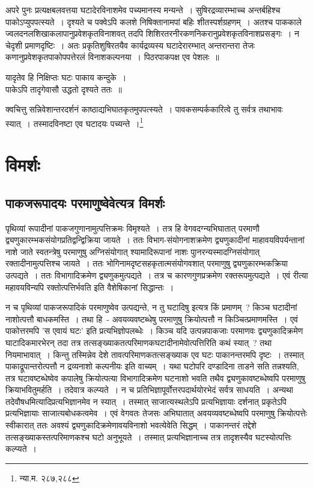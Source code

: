 		{\fontsize{11.7}{0}\selectfont\s अपरे पुनः प्रत्यक्षबलवत्तया घटादेरविनाशमेव पच्यमानस्य मन्यन्ते~। सुषिरद्रव्यारम्भाच्च अन्तर्बहिश्च पाकोऽप्युपपत्स्यते~। दृश्यते च पक्वेऽपि कलशे निषिक्तानामपां बहिः शीतस्पर्शग्रहणम्~। अतश्च पाककाले ज्वलदनलशिखाकलापानुप्रवेशकृतविनाशवत् तदपि शिशिरतरनीरकणनिकरानुप्रवेशकृतविनाशप्रसङ्गः~। न चेदृशी प्रमाणदृष्टिः~। अतः प्रकृतिशुषिरतयैव कार्यद्रव्यस्य घटादेरारम्भात् अन्तरान्तरा तेजः कणानुप्रवेशकृतपाकोपपत्तेरलं विनाशकल्पनया~। पिठरपाकपक्ष एव पेशलः~॥\\ \begin{center}यादृतेव हि निक्षिप्तः घटः पाकाय कन्दुके~।\\ पाकेऽपि तादृगेवासौ उद्धतो दृश्यते ततः~॥\\ \end{center} क्वचित्तु सन्निवेशान्तरदर्शनं काष्ठाद्यभिघातकृतमुपपत्स्यते~। पावकसम्पर्ककारित्वे तु सर्वत्र तथाभावः स्यात्~। तस्मादविनष्टा एव घटादयः पच्यन्ते~।\footnote{न्या.म. २८७,२८८}}

	\section{विमर्शः}

		\subsection{पाकजरूपादयः परमाणुष्वेवेत्यत्र विमर्शः}

		पृथिव्यां रूपादीनां पाकजगुणानामुत्पत्तिक्रमः विमृश्यते~। तत्र हि वेगवदग्न्यभिघातात् परमाणौ द्व्यणुकारम्भकसंयोगप्रतिद्वन्द्विक्रिया जायते~। ततः विभाग-संयोगनाशक्रमेण द्व्यणुकादीनां माहावयविपर्यन्तानां नाशे जाते स्वतन्त्रेषु परमाणुषु अग्निसंयोगात् श्यामादिरूपानां नाशः पाुनरन्यस्मादग्निसंयोगात् रक्तादीनामुत्पत्तिश्च जायते~। ततः भोगिनामदृष्टसहकृतात्मसंयोगवशात् परमाणुषु द्व्यणुकारम्भकक्रिया उत्पद्यते~। ततः विभागादिक्रमेण द्व्यणुकमुत्पद्यते~। तत्र च कारणगुणप्रक्रमेण रक्तरूपमुत्पद्यते~। एवं रीत्या महावयविन्यपि रक्तोत्पत्तिर्भवति इति वैशेषिकानां सिद्धान्तः~।

		न च पृथिव्यां पाकजरूपादिकं परमाणुष्वेव उत्पद्यन्ते, न तु घटादिषु इत्यत्र किं प्रमाणम्~? किञ्च घटादीनां नाशोत्पत्तौ बाधकमस्ति~। तथा हि~- अवयव्यवष्टब्धेषु परमाणुषु क्रियोत्पत्तौ न किञ्चित्प्रमाणमस्ति~। एवं पाकोत्तरमपि 'स एवायं घटः' इति प्रत्यभिज्ञोपलब्धेः~। किञ्च यदि उत्पन्नपाकजाः परमाणवः द्व्यणुकादिक्रमेण घाटादिकमारभेरन् तदा तत्र तत्सङ्ख्याकतत्परिमाणकघटादीनामेवोत्पत्तिरिति कथं स्यात्~? तथा नियमाभावात्~। किन्तु तस्मिन्नेव देशे तावत्परिमाणकतत्सङ्ख्याक एव घटः पाकानन्तरमपि दृष्टः~। तस्मात् पाकाद्रूपान्तरोत्पत्तौ न द्रव्यनाशो कल्पनीयः इति वाच्यम्~। यथा घटोपरि दण्डादिना ताडने सति तन्नश्यति, तत्र घटावष्टब्धेष्वेव कपालेषु क्रियोत्पत्या विभागादिक्रमेण घटनाशो भवति तथैव द्व्यणुकावष्टब्धेष्वपि परमाणुषु क्रियाभवितुमर्हति~। तदेवात्र कल्प्यते~। न च प्रतिभिज्ञापूर्वोत्तरपदार्थयोरभेदं सर्वत्र साधयति~। अन्यथा तदेवौषधमित्यादिप्रत्यभिज्ञानमेव न स्यात्~। तस्मात् साजात्यस्थलेऽपि प्रत्यभिज्ञायाः दर्शनात् प्रकृतेऽपि प्रत्यभिज्ञायाः साजात्यबोधकत्वमेव~। एवं वेगवतः तेजसः अभिघातात् अवयव्यवष्टब्धेष्वपि परमाणुषु क्रियोत्पत्तेः स्वीकारात् ततः अवश्यं द्व्यणुकादिक्रमेणावयविनाशो भवत्येवेति सिद्धम्~। पाकानन्तरं तद्देशे तत्सङ्ख्याकस्तत्परिमाणकश्च घटो अनुभूयते~। तस्मात् प्रत्यभिज्ञानाच्च तत्र तादृशस्यैव घटस्योत्पत्तिः कल्प्यते~।

